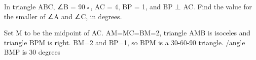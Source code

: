 In triangle ABC, ∠B = 90◦, 
AC = 4, BP = 1, and BP ⊥ AC. 
Find the value for the smaller of ∠A and ∠C, 
in degrees.

Set M to be the midpoint of AC. AM=MC=BM=2,
triangle AMB is isoceles and triangle BPM is right.
BM=2 and BP=1, so BPM is a 30-60-90 triangle.
/angle BMP is 30 degrees